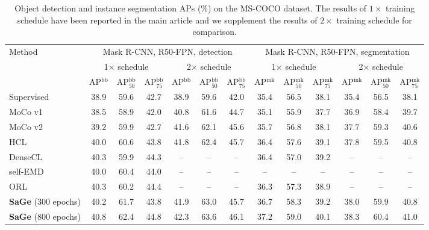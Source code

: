 \documentclass[10pt,twocolumn,letterpaper]{article}
\begin{document}
\begin{table*}[]
\renewcommand\arraystretch{1.0}
\setlength{\tabcolsep}{2.0mm}
\fontsize{9.5}{11.5}\selectfont
\centering
\begin{tabular}{l|ccc|ccc|ccc|ccc}
\toprule
\multirow{3}{*}{Method} & \multicolumn{6}{c|}{Mask R-CNN, R50-FPN, detection}  &\multicolumn{6}{c}{Mask R-CNN, R50-FPN,  segmentation} \\ \cline{2-13}
&\multicolumn{3}{c|}{1$\times$ schedule}  &\multicolumn{3}{c|}{2$\times$ schedule}  &\multicolumn{3}{c|}{1$\times$ schedule}  &\multicolumn{3}{c}{2$\times$ schedule} \\ \cline{2-13}
& AP$^{\mathrm{bb}}$  & AP$^{\mathrm{bb}}_{\mathrm{50}}$ & AP$^{\mathrm{bb}}_{\mathrm{75}}$  & AP$^{\mathrm{bb}}$  & AP$^{\mathrm{bb}}_{\mathrm{50}}$ & AP$^{\mathrm{bb}}_{\mathrm{75}}$   &AP$^{\mathrm{mk}}$  &AP$^{\mathrm{mk}}_{\mathrm{50}}$  &AP$^{\mathrm{mk}}_{\mathrm{75}}$   &AP$^{\mathrm{mk}}$  &AP$^{\mathrm{mk}}_{\mathrm{50}}$  &AP$^{\mathrm{mk}}_{\mathrm{75}}$\\ \midrule

Supervised    &38.9  &59.6  &42.7    &38.9  &59.6  &42.0   &35.4  &56.5   &38.1     &35.4  &56.5  &38.1  \\ \midrule
MoCo v1~\cite{he2020momentum} &38.5 &58.9  &42.0    & 40.8 &61.6 &44.7   &35.1  &55.9  &37.7  &36.9 &58.4 &39.7 \\
MoCo v2 ~\cite{chen2020improved} &39.2  &59.9  &42.7  &41.6  &62.1 &45.6  &35.7 &56.8  &38.1    &37.7  &59.3  &40.6   \\
HCL~\cite{HCL}  &40.0  & 60.6  &43.8  &41.8  & 62.4  &45.7   &36.4  &57.6  &39.1  &37.8  &59.5  & 40.8 \\
DenseCL~\cite{wang2021dense}  &40.3 &59.9 &44.3 &-- &-- &--    &36.4 &57.0 &39.2 &-- &-- &-- \\ 
self-EMD~\cite{liu2020self}  &40.0   &60.4  &44.0  &-- &-- &--  &-- &--	&-- &-- &-- &--\\
ORL~\cite{ORL} &40.3  &60.2  &44.4  &-- &-- &--  &36.3  &57.3  & 38.9  &-- &-- &-- \\ 
\midrule

\textbf{SaGe} (300 epochs) & 40.2  & 61.7  & 43.8  &41.9  &63.0  &45.7  &36.7  &58.3  &39.2  &38.0  &59.9  &40.8 \\
\textbf{SaGe} (800 epochs) & 40.8  & 62.4  & 44.8  &42.3  &63.6  &46.1  &37.2  &59.0  &40.1  &38.3  &60.4  &41.0\\ 
\bottomrule
\end{tabular}
\caption{Object detection and instance segmentation APs (\%) on the MS-COCO dataset. The results of $1\times$ training schedule have been reported in the main article and we supplement the results of $2\times$ training schedule for comparison.}
\label{tab:supp_coco}
\end{table*}
\end{document}
